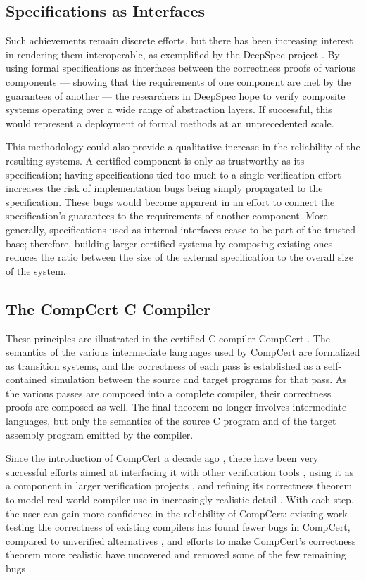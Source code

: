 \documentclass[acmsmall,timestamp,review,anonymous]{acmart}
\begin{document}
\subsection{Specifications as Interfaces} %

Such achievements remain discrete efforts, but
there has been increasing interest in rendering them interoperable,
as exemplified by the DeepSpec project \cite{deepspec}.
By using formal specifications as interfaces
between the correctness proofs of various components ---
showing that the requirements of one component
are met by the guarantees of another ---
the researchers in DeepSpec hope to
verify composite systems
operating over a wide range of abstraction layers.
If successful,
this would represent a deployment of formal methods
at an unprecedented scale.

This methodology could also provide a qualitative increase
in the reliability of the resulting systems.
A certified component is only as trustworthy as its specification;
having specifications tied too much to a single verification effort
increases the risk of
implementation bugs being simply propagated to
the specification.
These bugs would become apparent in an effort to
connect the specification's guarantees to
the requirements of another component.
More generally,
specifications used as internal interfaces
cease to be part of
the trusted base;
therefore,
building larger certified systems
by composing existing ones
reduces the
ratio between the size of the external specification to
the overall size of the system.


\subsection{The CompCert C Compiler} %

These principles are illustrated in
the certified C compiler CompCert \cite{compcert}.
The semantics of the various intermediate languages
used by CompCert are formalized as transition systems,
and the correctness of each pass is established
as a self-contained simulation between
the source and target programs for that pass.
As the various passes are composed into a complete compiler,
their correctness proofs are composed as well.
The final theorem no longer involves
intermediate languages,
but only the semantics of the source C program
and of the target assembly program emitted by the compiler.

Since the introduction of CompCert a decade ago \cite{compcert},
there have been very successful efforts aimed at
interfacing it with other verification tools \cite{vst},
using it as a component in larger verification projects \cite{popl15},
and refining its correctness theorem
to model real-world compiler use
in increasingly realistic detail
\cite{qompcert,sepcompcert,compcompcert,compcerttso,compcertshm}.
With each step,
the user can gain more confidence in the reliability of CompCert:
existing work testing the correctness of existing compilers
has found fewer bugs in CompCert,
compared to unverified alternatives \cite{csmith},
and efforts to make CompCert's correctness theorem more realistic
have uncovered and removed some of the few remaining bugs \cite{sepcompcert}.
\end{document}
